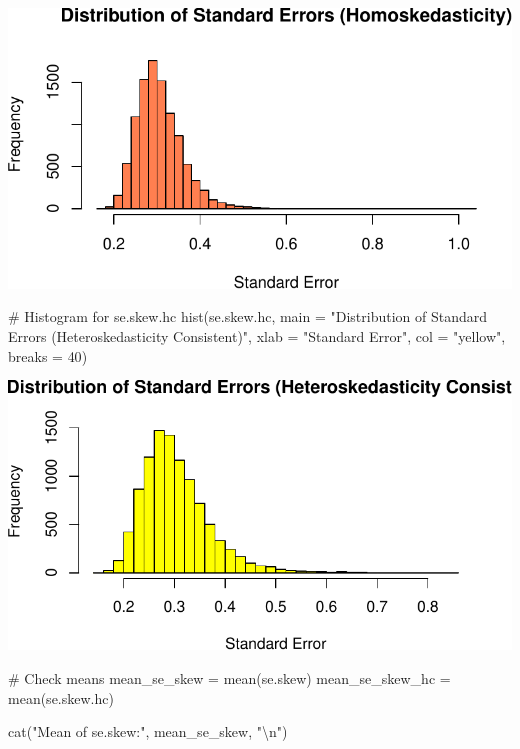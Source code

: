 \documentclass[
  11pt,
]{article}
\newenvironment{Shaded}{\begin{snugshade}}{\end{snugshade}}
\newcommand{\AttributeTok}[1]{\textcolor[rgb]{0.40,0.45,0.13}{#1}}
\newcommand{\CommentTok}[1]{\textcolor[rgb]{0.37,0.37,0.37}{#1}}
\newcommand{\DecValTok}[1]{\textcolor[rgb]{0.68,0.00,0.00}{#1}}
\newcommand{\FunctionTok}[1]{\textcolor[rgb]{0.28,0.35,0.67}{#1}}
\newcommand{\NormalTok}[1]{\textcolor[rgb]{0.00,0.23,0.31}{#1}}
\newcommand{\OtherTok}[1]{\textcolor[rgb]{0.00,0.23,0.31}{#1}}
\newcommand{\SpecialCharTok}[1]{\textcolor[rgb]{0.37,0.37,0.37}{#1}}
\newcommand{\StringTok}[1]{\textcolor[rgb]{0.13,0.47,0.30}{#1}}
\begin{document}
\includegraphics{HW-4-CODE-and-ANSWERS_files/figure-pdf/unnamed-chunk-13-1.pdf}

\begin{Shaded}
\begin{Highlighting}[]
\CommentTok{\# Histogram for se.skew.hc}
\FunctionTok{hist}\NormalTok{(se.skew.hc, }\AttributeTok{main =} \StringTok{"Distribution of Standard Errors (Heteroskedasticity Consistent)"}\NormalTok{,}
     \AttributeTok{xlab =} \StringTok{"Standard Error"}\NormalTok{, }\AttributeTok{col =} \StringTok{"yellow"}\NormalTok{, }\AttributeTok{breaks =} \DecValTok{40}\NormalTok{)}
\end{Highlighting}
\end{Shaded}

\includegraphics{HW-4-CODE-and-ANSWERS_files/figure-pdf/unnamed-chunk-13-2.pdf}

\begin{Shaded}
\begin{Highlighting}[]
\CommentTok{\# Check means}
\NormalTok{mean\_se\_skew }\OtherTok{=} \FunctionTok{mean}\NormalTok{(se.skew)}
\NormalTok{mean\_se\_skew\_hc }\OtherTok{=} \FunctionTok{mean}\NormalTok{(se.skew.hc)}

\FunctionTok{cat}\NormalTok{(}\StringTok{"Mean of se.skew:"}\NormalTok{, mean\_se\_skew, }\StringTok{"}\SpecialCharTok{\textbackslash{}n}\StringTok{"}\NormalTok{)}
\end{Highlighting}
\end{Shaded}
\end{document}

